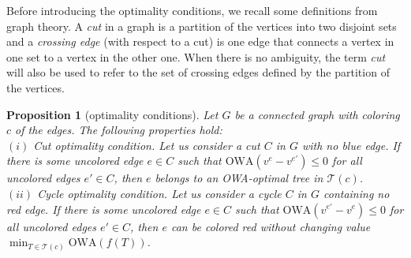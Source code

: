 \documentclass[final,3p,times]{elsarticle}
\newcommand{\owa}{\mbox{OWA}}
\newcommand{\Sol}{\mathcal{T}}
\newtheorem{prop}{\bf Proposition}
\begin{document}
Before introducing the optimality conditions, we recall some definitions
from graph theory. A \emph{cut} in a graph is a partition of the vertices
into two disjoint sets and a \emph{crossing edge} (with respect to a cut)
is one edge that connects a vertex in one set to a vertex in the other one.
When there is no ambiguity, the term \emph{cut} will also be used to refer
to the set of crossing edges defined by the partition of the vertices.

\begin{prop}[optimality conditions]
Let $G$ be a connected graph with coloring $c$ of the edges. The following
properties hold:\\ $(i)$ \emph{Cut optimality condition.} Let us consider a cut $C$ in $G$ with
no blue edge. If there is some uncolored edge $e\in C$ such that $\owa(v^e - v^{e'}) \leq 0$ for all uncolored edges $e'\in C$, then $e$ belongs to an OWA-optimal tree in $\Sol(c)$.\\
$(ii)$ \emph{Cycle optimality condition.} Let us consider a cycle $C$ in
$G$ containing no red edge. If there is some uncolored edge $e\in C$ such
that $\owa(v^{e'}-v^e) \leq 0$ for all uncolored edges $e'\in C$, then $e$ can be colored red without changing value $\min_{T \in \Sol(c)} \owa(f(T))$.
\label{cond}
\end{prop}
\end{document}
